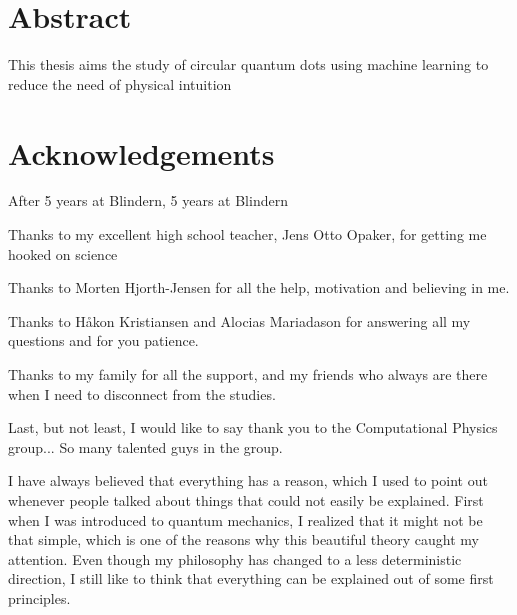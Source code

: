 \section*{Abstract}
This thesis aims the study of circular quantum dots using machine learning to reduce the need of physical intuition

\thispagestyle{empty}
\cleardoublepage

\section*{Acknowledgements}
After 5 years at Blindern, 
5 years at Blindern

Thanks to my excellent high school teacher, Jens Otto Opaker, for getting me hooked on science

Thanks to Morten Hjorth-Jensen for all the help, motivation and believing in me.

Thanks to Håkon Kristiansen and Alocias Mariadason for answering all my questions and for you patience. 

Thanks to my family for all the support, and my friends who always are there when I need to disconnect from the studies. 

Last, but not least, I would like to say thank you to the Computational Physics group... So many talented guys in the group. 

I have always believed that everything has a reason, which I used to point out whenever people talked about things that could not easily be explained. First when I was introduced to quantum mechanics, I realized that it might not be that simple, which is one of the reasons why this beautiful theory caught my attention. Even though my philosophy has changed to a less deterministic direction, I still like to think that everything can be explained out of some first principles. 
    
\thispagestyle{empty}
\cleardoublepage

\newpage

{%
    \tableofcontents
    \thispagestyle{empty}
    \clearpage}%

\thispagestyle{empty}
\clearpage


